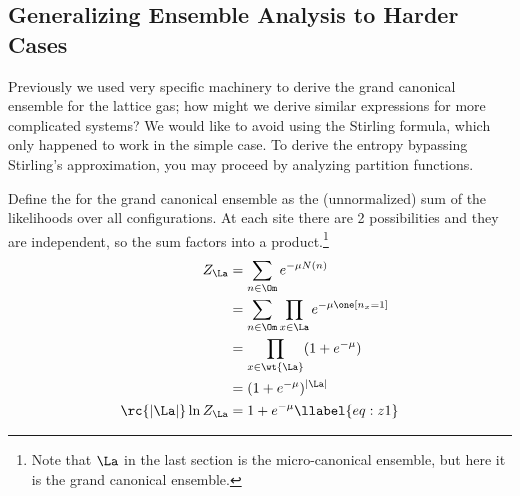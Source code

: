 

\subsection{Generalizing Ensemble Analysis to Harder Cases}

Previously we used very specific machinery to derive the grand canonical ensemble for the lattice gas; how might we derive similar expressions for more complicated systems?  We would like to avoid using the Stirling formula, which only happened to work in the simple case. 
To derive the entropy bypassing Stirling's approximation, you may proceed by analyzing partition functions. 

Define the  for the grand canonical ensemble as the (unnormalized) sum of the likelihoods over all configurations. At each site there are 2 possibilities and they are independent, so the sum factors into a product.\footnote{Note that $\La$ in the last section is the micro-canonical ensemble, but here it is the grand canonical ensemble.}
\begin{align}
\nonumber
Z_\La & = \sum_{n\in \Om} e^{-\mu N(n)} \\
\nonumber
&=\sum_{n\in \Om} \prod_{x\in \La} e^{-\mu \one[n_x=1]}\\
\nonumber
&=\prod_{x\in \wt{\La}}(1+e^{-\mu})\\
\nonumber
&= (1+e^{-\mu})^{|\La|}\\
\rc{|\La|} \ln Z_{\La} &= 1+e^{-\mu}
\llabel{eq:z1}
\end{align}

